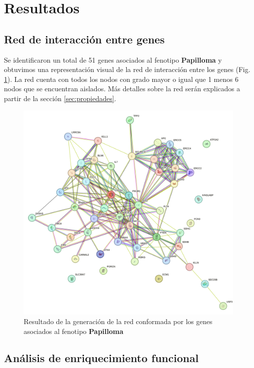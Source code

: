 
\section{Resultados}

\subsection{Red de interacción entre genes}

Se identificaron un total de 51 genes asociados al fenotipo \textbf{Papilloma} y obtuvimos una representación visual de la red de interacción entre los genes (Fig. \ref{fig:red_inicial}). La red cuenta con todos los nodos con grado mayor o igual que 1 menos 6 nodos que se encuentran aislados. Más detalles sobre la red serán explicados a partir de la sección \ref{sec:propiedades}.

\begin{figure}[b]
	\centering
	\includegraphics[width=0.98\linewidth]{figures/red_inicial}
	\caption{Resultado de la generación de la red conformada por los genes asociados al fenotipo \textbf{Papilloma}}
	\label{fig:red_inicial}
\end{figure} 


\subsection{Análisis de enriquecimiento funcional}

